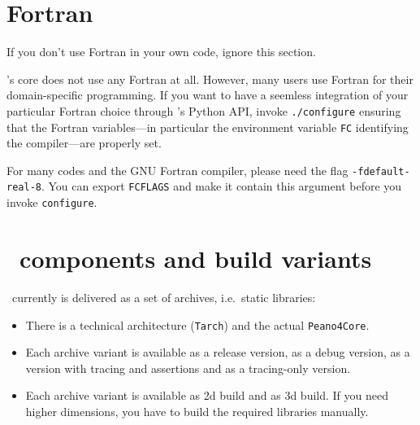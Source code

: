 \section{Fortran}

\begin{remark} 
 If you don't use Fortran in your own code, ignore this section.
\end{remark}

\Peano's core does not use any Fortran at all. 
However, many users use Fortran for their domain-specific programming.
If you want to have a seemless integration of your particular Fortran choice
through \Peano's Python API, invoke \texttt{./configure} ensuring that the
Fortran variables---in particular the environment variable \texttt{FC}
identifying the compiler---are properly set.


For many codes and the GNU Fortran compiler, please need the flag
\texttt{-fdefault-real-8}.
You can export \texttt{FCFLAGS} and make it contain this argument before you
invoke \texttt{configure}.



\section{\Peano\ components and build variants}
\label{chapter:installation:build-variants}

\Peano\ currently is delivered as a set of archives, i.e.~static libraries:
\begin{itemize}
  \item There is a technical architecture (\texttt{Tarch}) and the actual
  \texttt{Peano4Core}.
  \item Each archive variant is available as a release version, as a debug
  version, as a version with tracing and assertions and as a tracing-only
  version.
  \item Each archive variant is available as 2d build and as 3d build. If you
  need higher dimensions, you have to build the required libraries manually.
\end{itemize}


